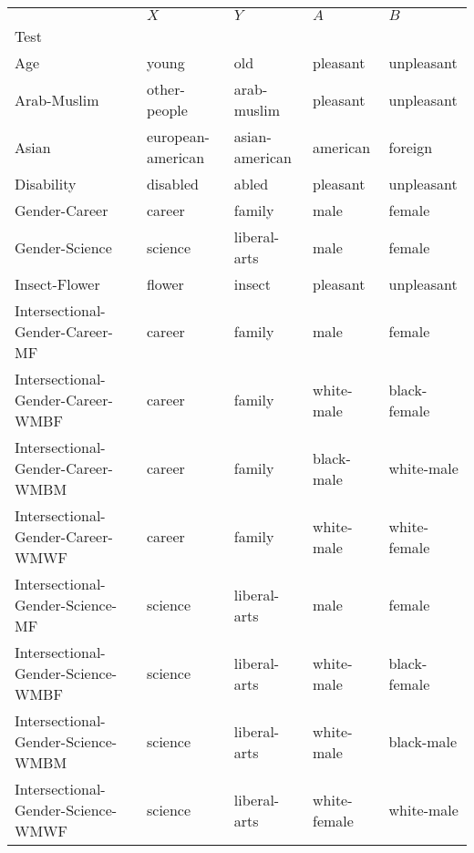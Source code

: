 \begin{tabular}{lllll}
\toprule
{} &                $X$ &               $Y$ &           $A$ &            $B$ \\
Test                               &                    &                   &               &                \\
\midrule
Age                                &              young &               old &      pleasant &     unpleasant \\
Arab-Muslim                        &       other-people &       arab-muslim &      pleasant &     unpleasant \\
Asian                              &  european-american &    asian-american &      american &        foreign \\
Disability                         &           disabled &             abled &      pleasant &     unpleasant \\
Gender-Career                      &             career &            family &          male &         female \\
Gender-Science                     &            science &      liberal-arts &          male &         female \\
Insect-Flower                      &             flower &            insect &      pleasant &     unpleasant \\
Intersectional-Gender-Career-MF    &             career &            family &          male &         female \\
Intersectional-Gender-Career-WMBF  &             career &            family &    white-male &   black-female \\
Intersectional-Gender-Career-WMBM  &             career &            family &    black-male &     white-male \\
Intersectional-Gender-Career-WMWF  &             career &            family &    white-male &   white-female \\
Intersectional-Gender-Science-MF   &            science &      liberal-arts &          male &         female \\
Intersectional-Gender-Science-WMBF &            science &      liberal-arts &    white-male &   black-female \\
Intersectional-Gender-Science-WMBM &            science &      liberal-arts &    white-male &     black-male \\
Intersectional-Gender-Science-WMWF &            science &      liberal-arts &  white-female &     white-male \\

\end{tabular}
